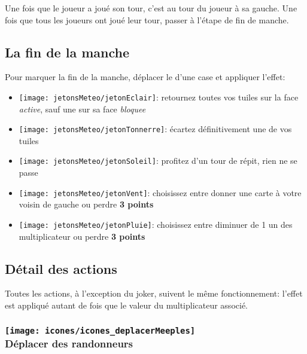Une fois que le joueur a joué son tour, c'est au tour du joueur à sa gauche. Une fois que tous les joueurs ont joué leur tour, passer à l'étape de fin de manche.

\subsection*{La fin de la manche} \label{sec:finDeManche}
Pour marquer la fin de la manche, déplacer le \compteurManche d'une case et appliquer l'effet:
\begin{itemize}
\item \texttt{[image: jetonsMeteo/jetonEclair]}: retournez toutes vos tuiles sur la face \textit{active}, sauf une sur sa face \textit{bloquee}
\item \texttt{[image: jetonsMeteo/jetonTonnerre]}: écartez définitivement une de vos tuiles
\item \texttt{[image: jetonsMeteo/jetonSoleil]}: profitez d'un tour de répit, rien ne se passe
\item \texttt{[image: jetonsMeteo/jetonVent]}: choisissez entre donner une carte à votre voisin de gauche ou perdre \textbf{3 points}
\item \texttt{[image: jetonsMeteo/jetonPluie]}: choisissez entre diminuer de 1 un des multiplicateur ou perdre \textbf{3 points}
\end{itemize}

\subsection*{Détail des actions} \label{sec:actions}
Toutes les actions, à l'exception du joker, suivent le même fonctionnement: l'effet est appliqué autant de fois que le valeur du multiplicateur associé.
\subsubsection*{\texttt{[image: icones/icones\_deplacerMeeples]} \\ Déplacer des randonneurs}

